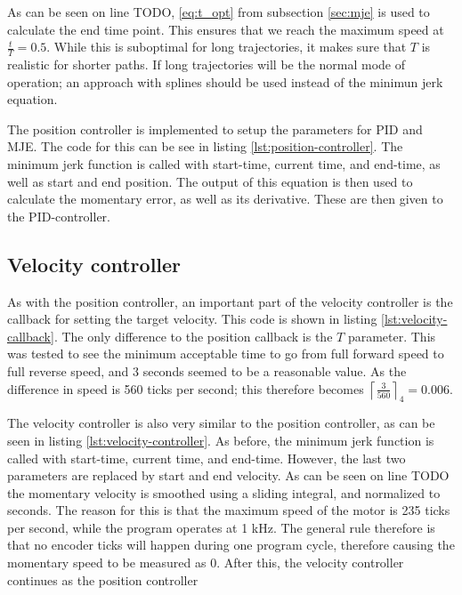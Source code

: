 \documentclass[11pt]{article}
\begin{document}
As can be seen on line TODO, \ref{eq:t_opt} from subsection \vref{sec:mje} is used to calculate the end time point. This ensures that we  reach the maximum speed at $\frac{t}{T} = 0.5$. While this is suboptimal for long trajectories, it makes sure that $T$ is realistic for shorter paths. If long trajectories will be the normal mode of operation; an approach with splines should be used instead of the minimun jerk equation. \par



The position controller is implemented to setup the parameters for PID and MJE. The code for this can be see in listing \vref{lst:position-controller}. The minimum jerk function is called with start-time, current time, and end-time, as well as start and end position. The output of this equation is then used to calculate the momentary error, as well as its derivative. These are then given to the PID-controller. \par



\subsection{Velocity controller}
As with the position controller, an important part of the velocity controller is the callback for setting the target velocity. This code is shown in listing \vref{lst:velocity-callback}. The only difference to the position callback is the $T$ parameter. This was tested to see the minimum acceptable time to go from full forward speed to full reverse speed, and 3 seconds seemed to be a reasonable value. As the difference in speed is 560 ticks per second; this therefore becomes $\left\lceil\frac{3}{560}\right\rceil _4 = 0.006$. \par



The velocity controller is also very similar to the position controller, as can be seen in listing \vref{lst:velocity-controller}. As before, the minimum jerk function is called with start-time, current time, and end-time. However, the last two parameters are replaced by  start and end velocity. As can be seen on line TODO the momentary velocity is smoothed using a sliding integral, and normalized to seconds. The reason for this is that the maximum speed of the motor is 235 ticks per second, while the program operates at 1 kHz. The general rule therefore is that no encoder ticks will happen during one program cycle, therefore causing the momentary speed to be measured as 0. After this, the velocity controller continues as the position controller
\end{document}
